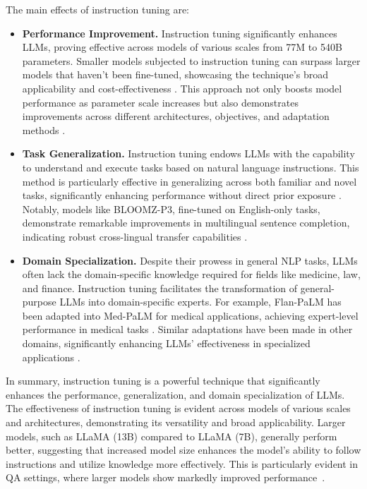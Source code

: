 The main effects of instruction tuning are:
\begin{itemize}
	\item \textbf{Performance Improvement.} {
		      Instruction tuning significantly enhances LLMs, proving effective across models of various scales from 77M to 540B parameters. Smaller models subjected to instruction tuning can surpass larger models that haven't been fine-tuned, showcasing the technique's broad applicability and cost-effectiveness \cite{tamkin2021understanding, wei2022fine}. This approach not only boosts model performance as parameter scale increases but also demonstrates improvements across different architectures, objectives, and adaptation methods \cite{raffel2023exploring}.
	      }
	\item \textbf{Task Generalization.} {
		      Instruction tuning endows LLMs with the capability to understand and execute tasks based on natural language instructions. This method is particularly effective in generalizing across both familiar and novel tasks, significantly enhancing performance without direct prior exposure \cite{chowdhery2022palm, tamkin2021understanding}. Notably, models like BLOOMZ-P3, fine-tuned on English-only tasks, demonstrate remarkable improvements in multilingual sentence completion, indicating robust cross-lingual transfer capabilities \cite{lewis2021paLM}.
	      }
	\item \textbf{Domain Specialization.} {
		      Despite their prowess in general NLP tasks, LLMs often lack the domain-specific knowledge required for fields like medicine, law, and finance. Instruction tuning facilitates the transformation of general-purpose LLMs into domain-specific experts. For example, Flan-PaLM has been adapted into Med-PaLM for medical applications, achieving expert-level performance in medical tasks \cite{raffel2023exploring}. Similar adaptations have been made in other domains, significantly enhancing LLMs' effectiveness in specialized applications \cite{wei2022fine}.
	      }
\end{itemize}

In summary, instruction tuning is a powerful technique that significantly enhances the performance, generalization, and domain specialization of LLMs. The effectiveness of instruction tuning is evident across models of various scales and architectures, demonstrating its versatility and broad applicability.
Larger models, such as LLaMA (13B) compared to LLaMA (7B), generally perform better, suggesting that increased model size enhances the model’s ability to follow instructions and utilize knowledge more effectively.
This is particularly evident in QA settings, where larger models show markedly improved performance~\cite{survey}.

